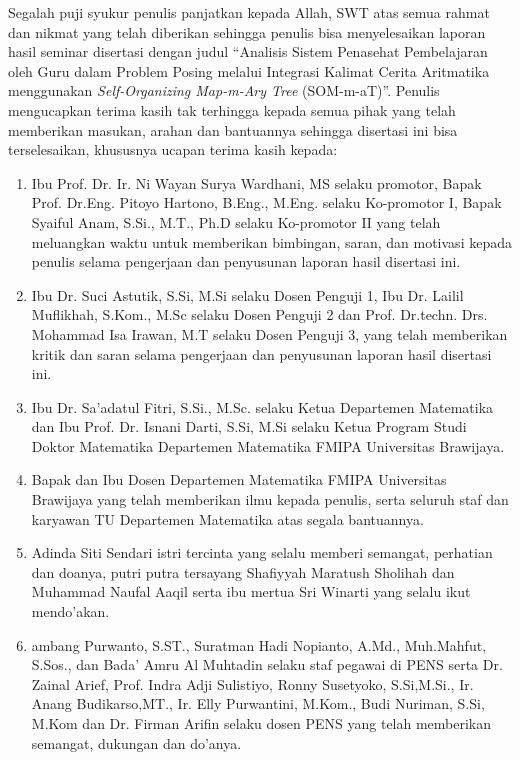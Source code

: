 \documentclass{disertasiub}
\begin{document}
	\linespread{1.15}

 

\Awal
\Sampul
\Cover
\LembarPersetujuan
\Identitas
\Orisinalitas
\RiwayatHidup
\Ringkasan
\Summary
\newpage
\KataPengantar

Segalah puji syukur penulis panjatkan kepada Allah, SWT atas semua rahmat dan nikmat yang telah diberikan sehingga penulis bisa menyelesaikan laporan hasil seminar disertasi dengan judul “Analisis Sistem Penasehat Pembelajaran oleh Guru dalam Problem Posing melalui Integrasi Kalimat Cerita Aritmatika menggunakan \textit{Self-Organizing Map-m-Ary Tree}  (SOM-m-aT)”.
Penulis mengucapkan terima kasih tak terhingga kepada semua pihak yang telah memberikan masukan, arahan dan bantuannya sehingga disertasi ini bisa terselesaikan, khususnya ucapan terima kasih kepada:

\begin{enumerate}
	\item Ibu Prof. Dr. Ir. Ni Wayan Surya Wardhani, MS selaku promotor, Bapak Prof. Dr.Eng. Pitoyo Hartono, B.Eng., M.Eng. selaku Ko-promotor I, Bapak Syaiful Anam, S.Si., M.T., Ph.D selaku Ko-promotor II yang telah meluangkan waktu untuk memberikan bimbingan, saran, dan motivasi kepada penulis selama pengerjaan dan penyusunan laporan hasil disertasi ini.
	
	\item Ibu Dr. Suci Astutik, S.Si, M.Si selaku Dosen Penguji 1, Ibu Dr. Lailil Muflikhah, S.Kom., M.Sc selaku Dosen Penguji 2 dan Prof. Dr.techn. Drs. Mohammad Isa Irawan, M.T selaku Dosen Penguji 3, yang telah memberikan kritik dan saran selama pengerjaan dan penyusunan laporan hasil disertasi ini.
	
	\item Ibu Dr. Sa’adatul Fitri, S.Si., M.Sc. selaku Ketua Departemen Matematika dan Ibu Prof. Dr. Isnani Darti, S.Si, M.Si selaku Ketua Program Studi Doktor Matematika Departemen Matematika FMIPA Universitas Brawijaya.
	
	\item Bapak dan Ibu Dosen Departemen Matematika FMIPA Universitas Brawijaya yang telah memberikan ilmu kepada penulis, serta seluruh staf dan karyawan TU Departemen Matematika atas segala bantuannya.
	
	\item Adinda Siti Sendari istri tercinta yang selalu memberi semangat, perhatian dan doanya, putri putra tersayang Shafiyyah Maratush Sholihah dan Muhammad Naufal Aaqil serta ibu mertua Sri Winarti yang selalu ikut mendo’akan.
	
	\item ambang Purwanto, S.ST., Suratman Hadi Nopianto, A.Md., Muh.Mahfut, S.Sos., dan Bada’ Amru Al Muhtadin selaku staf pegawai di PENS serta Dr. Zainal Arief, Prof. Indra Adji Sulistiyo, Ronny Susetyoko, S.Si,M.Si., Ir. Anang Budikarso,MT., Ir. Elly Purwantini, M.Kom., Budi Nuriman, S.Si, M.Kom dan Dr. Firman Arifin selaku dosen PENS yang telah memberikan semangat, dukungan dan do’anya.
\end{enumerate}
\end{document}
